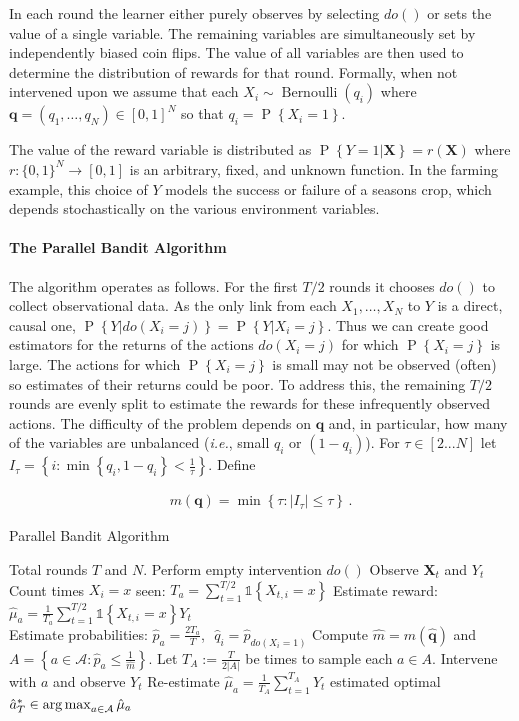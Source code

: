 \documentclass[11pt,a4paper,oneside]{book}
\newcommand{\actions}{\mathcal{A}}
\newcommand{\ie}{\textit{i.e.}}
\newcommand{\set}[1]{\left\{#1\right\}}
\newcommand{\ind}[1]{\mathds{1}\!\!\set{#1}}
\newcommand{\argmax}{\operatornamewithlimits{arg\,max}}
\newcommand{\eq}[1]{\begin{align*}#1\end{align*}}
\renewcommand{\P}[1]{\operatorname{P}\left\{#1\right\}}
\newcommand{\bernoulli}{\operatorname{Bernoulli}}
\renewcommand{\vec}[1]{\boldsymbol{#1}}
\begin{document}
In each round the learner either purely observes by selecting $do()$ or sets the value of a single variable. The remaining variables are simultaneously set by independently biased coin flips. The value of all variables are then used to determine the distribution of rewards for that round. Formally, when not intervened upon we assume that each $X_i \sim \bernoulli(q_i)$ where $\vec{q} = (q_1, \ldots, q_N) \in [0,1]^N$ so that $q_i = \P{X_i = 1}$.

The value of the reward variable is distributed as $\P{Y = 1|\vec{X}} = r(\vec{X})$ where 
$r : \{0,1\}^N \to [0,1]$ is an arbitrary, fixed, and unknown function. 
In the farming example, this choice of $Y$ models the success or failure of a seasons crop, 
which depends stochastically on the various environment variables.


\paragraph{The Parallel Bandit Algorithm}
The algorithm operates as follows. For the first $T/2$ rounds it chooses $do()$ to collect observational data. As the only link from each $X_1,\ldots,X_N$ to $Y$ is a direct, causal one, $\P{Y|do(X_i=j)}=\P{Y|X_i=j}$. Thus we can create good estimators for the returns of the actions $do(X_i = j)$ for which $\P{X_i = j}$ is large. The actions for which $\P{X_i = j}$ is small may not be observed (often) so  estimates of their returns could be poor. To address this, the remaining $T/2$ rounds are evenly split to estimate the rewards for these infrequently observed actions. The difficulty of the problem depends on $\vec{q}$ and, in particular, how many of the variables are unbalanced (\ie, small $q_i$ or $(1-q_i)$). For $\tau \in [2...N]$ let $I_\tau = \set{ i : \min\set{q_i, 1-q_i} < \frac{1}{\tau}}$. Define

\eq{
\label{eq:m-simple}
m(\vec{q}) = \min \set{ \tau : |I_{\tau}| \leq \tau}\,.
}


\begin{algorithm}[H]
\caption{Parallel Bandit Algorithm}\label{alg:simple}
\begin{algorithmic}[1]
 Total rounds $T$ and $N$.
\STATE Perform empty intervention $do()$
\STATE Observe $\vec{X}_t$ and $Y_t$
\ENDFOR
\FOR{$a = do(X_i = x) \in \actions$}
\STATE Count times $X_i = x$ seen: $T_a = \sum_{t=1}^{T/2} \ind{X_{t,i} = x}$
\STATE Estimate reward: $\hat{\mu}_a = \frac{1}{T_a} \sum_{t=1}^{T/2} \ind{X_{t,i} = x} Y_t$ \\[0.2cm]
\STATE Estimate probabilities: $\hat{p}_a = \frac{2 T_a}{T}$,\,\, $\hat q_i = \hat p_{do(X_i = 1)}$
\ENDFOR
\STATE Compute $\hat{m} = m(\vec{\hat q})$ and $A = \set{a \in \actions \colon \hat{p}_a \leq \frac{1}{\hat m}}$.
\STATE Let $T_A := \frac{T}{2 |A|}$ be times to sample each $a\in A$.
\STATE Intervene with $a$ and observe $Y_t$
\ENDFOR
\STATE Re-estimate $\hat{\mu}_a = \frac{1}{T_A} \sum_{t=1}^{T_A} Y_t$
\ENDFOR
\RETURN estimated optimal $\hat{a}^*_T \in \argmax_{a\in\actions} \hat{\mu}_a$
\end{algorithmic}
\end{algorithm}
\end{document}
